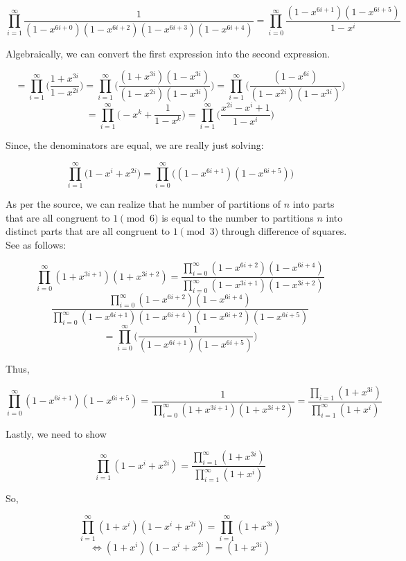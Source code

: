 \documentclass[12pt]{exam}
\begin{document}
\begin{enumerate}
$$
\prod_{i = 1}^{\infty}
\frac{1}{(1 - x^{6i + 0})(1 - x^{6i + 2}) (1 - x^{6i + 3}) (1 - x^{6i + 4})}
= \prod_{i = 0}^{\infty} \frac{(1 - x^{6i + 1})(1 - x^{6i + 5})}{1 - x^{i}}
$$

Algebraically, we can convert the first expression into the second expression. 

$$
= \prod_{i = 1}^{\infty} \Big ( \frac{1 + x^{3i}}{1 - x^{2i}} \Big )
= \prod_{i = 1}^{\infty} \Bigg ( \frac{(1 + x^{3i})(1 - x^{3i})}{(1 - x^{2i})(1 - x^{3i})} \Bigg )
= \prod_{i = 1}^{\infty} \Bigg ( \frac{(1 - x^{6i})}{(1 - x^{2i})(1 - x^{3i})} \Bigg )
$$
$$
= \prod_{i = 1}^{\infty} \Bigg ( -x^{k} + \frac{1}{1 - x^{k}} \Bigg )
= \prod_{i = 1}^{\infty} \Bigg ( \frac{x^{2i} - x^{i} + 1}{1 - x^{i}} \Bigg ) 
$$

Since, the denominators are equal, we are really just solving: 

$$
\prod_{i = 1}^{\infty} \Big (1 - x^i + x^{2i} \Big ) = \prod_{i = 0}^{\infty} \Big ( (1 - x^{6i + 1})(1 - x^{6i + 5}) \Big )
$$

As per the source, we can realize that he number of partitions of $n$ into parts that are all congruent to $1 \pmod 6$ is equal to the number to partitions $n$ into distinct parts that are all congruent to $1 \pmod 3$ through difference of squares. See as follows: 

$$
\prod_{i = 0}^{\infty} (1 + x^{3i + 1})(1 + x^{3i + 2}) = \frac{\prod_{i = 0}^{\infty} ( 1- x^{6i + 2})(1 - x^{6i + 4})}{\prod_{i = 0}^{\infty}(1 - x^{3i  + 1})( 1- x^{3i + 2})}
$$
$$
\frac{\prod_{i = 0}^{\infty} ( 1- x^{6i + 2})(1 - x^{6i + 4})}{\prod_{i = 0}^{\infty}(1 - x^{6i + 1})(1 - x^{6i + 4})(1 - x^{6i + 2})(1 - x^{6i + 5})}
$$
$$
= \prod_{i = 0}^{\infty} \Bigg ( \frac{1}{(1 - x^{6i + 1})(1 - x^{6i + 5})} \Bigg )
$$

Thus, 

$$
\prod_{i = 0}^{\infty}(1 - x^{6i + 1})(1 - x^{6i + 5}) = \frac{1}{\prod_{i = 0}^{\infty}(1 + x^{3i + 1})(1 + x^{3i + 2})} = \frac{\prod_{i = 1} ( 1 + x^{3i})}{\prod_{i = 1}^{\infty}( 1 + x^{i})}
$$

Lastly, we need to show

$$
\prod_{i = 1}^{\infty} (1 - x^{i} + x^{2i}) = \frac{\prod_{i = 1}^{\infty} ( 1 + x^{3i})}{\prod_{i = 1}^{\infty}( 1 + x^{i})}
$$

So, 

$$
\prod_{i = 1}^{\infty} ( 1 + x^{i})(1 - x^{i} + x^{2i}) = \prod_{i = 1}^{\infty} (1 + x^{3i})
$$
$$
\iff ( 1 + x^{i})(1 - x^{i} + x^{2i}) = (1 + x^{3i})
$$


\end{enumerate}
\end{document}
